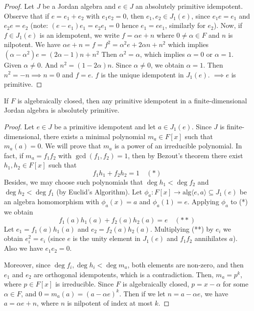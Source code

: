 \documentclass{article}
\begin{document}
\begin{proof}  
Let $J$ be a Jordan algebra and $e \in J$ an absolutely primitive idempotent. Observe that if $e = e_1 + e_2$ with $e_1 e_2 = 0$, then $e_1, e_2 \in J_1(e)$, since $e_1 e = e_1$ and $e_2 e = e_2$ (note: $ (e-e_1)e_1=e_2e_1=0 $ hence $ e_1=ee_1 $, similarly for $ e_2 $). Now, if $f \in J_1(e)$ is an idempotent, we write $f = \alpha e + n$ where $0 \neq \alpha \in F$ and $n$ is nilpotent. We have $ \alpha e + n = f = f^2 = \alpha^2 e + 2\alpha n + n^2 $ which implies $ (\alpha - \alpha^2)e = (2\alpha - 1)n + n^2 $ Then $\alpha^2=\alpha$, which implies $\alpha=0$ or $\alpha=1$. Given $\alpha \neq 0$. And $n^2=(1-2\alpha)n$. Since $\alpha \neq 0$, we obtain $\alpha=1$. Then $n^2=-n \implies n=0$ and $f=e$. $f$ is the unique idempotent in $J_1(e)$. $\implies e$ is primitive.   
\end{proof} 

\begin{lemma}  
If $F$ is algebraically closed, then any primitive idempotent in a finite-dimensional Jordan algebra is absolutely primitive.  
\end{lemma}  

\begin{proof}  
Let $e \in J$ be a primitive idempotent and let $a \in J_1(e)$. Since $J$ is finite-dimensional, there exists a minimal polynomial $m_a \in F[x]$ such that $m_a(a)=0$. We will prove that $m_a$ is a power of an irreducible polynomial. In fact, if $m_a = f_1 f_2$ with $\gcd(f_1, f_2)=1$, then by Bezout's theorem there exist $h_1, h_2 \in F[x]$ such that 
\[ f_1 h_1 + f_2 h_2 = 1 \quad (*) \] 
Besides, we may choose such polynomials that $\deg h_1 < \deg f_2$ and $\deg h_2 < \deg f_1$ (by Euclid's Algorithm). Let $\phi_a : F[x] \to \mathrm{alg}\langle e, a \rangle \subseteq J_1(e)$ be an algebra homomorphism with $\phi_a(x) = a$ and $\phi_a(1) = e$. Applying $\phi_a$ to (*) we obtain 
\[ f_1(a)h_1(a) + f_2(a)h_2(a) = e \quad (**) \] 
Let $e_1 = f_1(a)h_1(a)$ and $e_2 = f_2(a)h_2(a)$. Multiplying (**) by $e_i$ we obtain $e_i^2 = e_i$ (since $e$ is the unity element in $J_1(e)$ and $f_1 f_2$ annihilates $a$). Also we have $e_1 e_2 = 0$.  

Moreover, since $\deg f_i, \deg h_i < \deg m_a$, both elements are non-zero, and then $e_1$ and $e_2$ are orthogonal idempotents, which is a contradiction. Then, $m_a = p^k$, where $p \in F[x]$ is irreducible. Since $F$ is algebraically closed, $p = x-\alpha$ for some $\alpha \in F$, and $0=m_a(a)=(a-\alpha e)^k$. Then if we let $n = a-\alpha e$, we have $a=\alpha e + n$, where $n$ is nilpotent of index at most $k$.  
\end{proof} 
\end{document}

